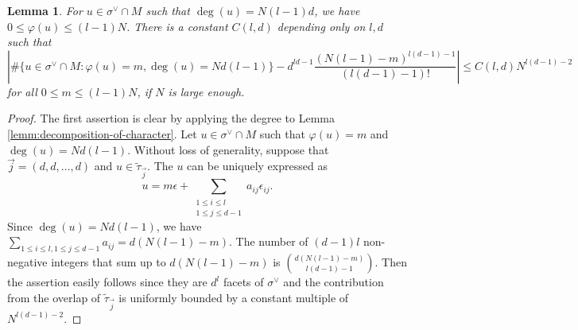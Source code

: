 \documentclass[letterpaper,11pt]{amsart}
\theoremstyle{plain}
\newtheorem{lemm}[theo]{Lemma}
\theoremstyle{definition}
\theoremstyle{remark}
\newcommand{\eps}{\epsilon}
\newcommand{\dual}{^{\vee}}
\begin{document}
    \begin{lemm} \label{lemm:number-of-lattice-points}
        For $u \in \sigma\dual \cap M$ such that $\deg(u) = N(l-1)d$, we have $0 \leq \varphi(u) \leq (l-1)N$. There is a constant $C(l,d)$ depending only on $l, d$ such that
        $$ \left| \# \Big\{ u \in \sigma\dual \cap M : \varphi(u) =m, \deg(u) = Nd(l-1)\Big\} - d^{ld-1}\frac{(N(l-1)-m)^{l(d-1)-1}}{(l(d-1)-1)!} \right| \leq C(l,d) N^{l(d-1)-2}$$
        for all $0 \leq m \leq (l-1)N$, if $N$ is large enough.
    \end{lemm}
    \begin{proof}
        The first assertion is clear by applying the degree to Lemma \ref{lemm:decomposition-of-character}. Let $u \in \sigma\dual \cap M$ such that $\varphi(u) = m$ and $\deg(u) = Nd(l-1)$. Without loss of generality, suppose that $\vec{j} = (d,d,\ldots, d)$ and $u \in \widetilde{\tau}_{\vec{j}}$. The $u$ can be uniquely expressed as
        $$ u = m \eps + \sum_{\substack{1 \leq i \leq l \\ 1 \leq j \leq d-1}} a_{ij} \eps_{ij} .$$
        Since $\deg (u) = Nd(l-1)$, we have $\sum_{1 \leq i \leq l, 1\leq j \leq d-1} a_{ij} = d(N(l-1)-m)$. The number of $(d-1)l$ non-negative integers that sum up to $d(N(l-1)-m)$ is ${ d(N(l-1)-m) \choose l(d-1)-1}$. Then the assertion easily follows since they are $d^{l}$ facets of $\sigma\dual$ and the contribution from the overlap of $\widetilde{\tau}_{\vec{j}}$ is uniformly bounded by a constant multiple of $N^{l(d-1)-2}$.
    \end{proof}
\end{document}
